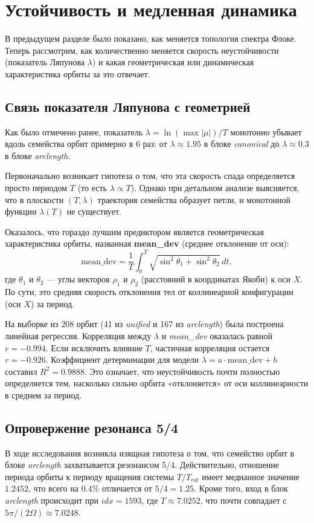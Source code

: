 \section{Устойчивость и медленная динамика}

В предыдущем разделе было показано, как меняется топология спектра Флоке. Теперь рассмотрим, как количественно меняется скорость неустойчивости (показатель Ляпунова \(\lambda\)) и какая геометрическая или динамическая характеристика орбиты за это отвечает.

\subsection{Связь показателя Ляпунова с геометрией}
Как было отмечено ранее, показатель \(\lambda = \ln(\max |\mu|)/T\) монотонно убывает вдоль семейства орбит примерно в 6 раз: от \(\lambda \approx 1.95\) в блоке \textit{canonical} до \(\lambda \approx 0.3\) в блоке \textit{arclength}. 

Первоначально возникает гипотеза о том, что эта скорость спада определяется просто периодом \(T\) (то есть \(\lambda \propto T\)). Однако при детальном анализе выясняется, что в плоскости \((T, \lambda)\) траектория семейства образует петли, и монотонной функции \(\lambda(T)\) не существует. 

Оказалось, что гораздо лучшим предиктором является геометрическая характеристика орбиты, названная \textbf{mean\_dev} (среднее отклонение от оси):
\begin{equation}
    \text{mean\_dev} = \frac{1}{T} \int_0^T \sqrt{\sin^2\theta_1 + \sin^2\theta_2} \, dt,
\end{equation}
где \(\theta_1\) и \(\theta_2\) — углы векторов \(\rho_1\) и \(\rho_2\) (расстояний в координатах Якоби) к оси \(X\). По сути, это средняя скорость отклонения тел от коллинеарной конфигурации (оси \(X\)) за период.

На выборке из 208 орбит (41 из \textit{unified} и 167 из \textit{arclength}) была построена линейная регрессия. Корреляция между \(\lambda\) и \textit{mean\_dev} оказалась равной \(r = -0.994\). Если исключить влияние \(T\), частичная корреляция остается \(r = -0.926\). Коэффициент детерминации для модели \(\lambda = a \cdot \text{mean\_dev} + b\) составил \(R^2 = 0.9888\). Это означает, что неустойчивость почти полностью определяется тем, насколько сильно орбита «отклоняется» от оси коллинеарности в среднем за период.

\subsection{Опровержение резонанса 5/4}
В ходе исследования возникла изящная гипотеза о том, что семейство орбит в блоке \textit{arclength} захватывается резонансом 5/4. Действительно, отношение периода орбиты к периоду вращения системы \(T / T_{rot}\) имеет медианное значение \(1.2452\), что всего на \(0.4\%\) отличается от \(5/4 = 1.25\). Кроме того, вход в блок \textit{arclength} происходит при \(idx=1593\), где \(T \approx 7.0252\), что почти совпадает с \(5 \pi / (2\Omega) \approx 7.0248\).


